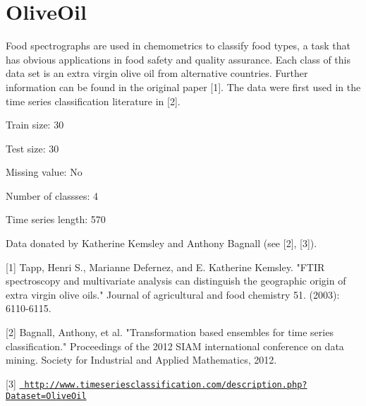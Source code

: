 \chapter{Olive\+Oil}
\hypertarget{md_external_2data_2UCRArchive__2018_2OliveOil_2README}{}\label{md_external_2data_2UCRArchive__2018_2OliveOil_2README}
\label{md_external_2data_2UCRArchive__2018_2OliveOil_2README_autotoc_md158}%
%
 Food spectrographs are used in chemometrics to classify food types, a task that has obvious applications in food safety and quality assurance. Each class of this data set is an extra virgin olive oil from alternative countries. Further information can be found in the original paper \mbox{[}1\mbox{]}. The data were first used in the time series classification literature in \mbox{[}2\mbox{]}.

Train size\+: 30

Test size\+: 30

Missing value\+: No

Number of classses\+: 4

Time series length\+: 570

Data donated by Katherine Kemsley and Anthony Bagnall (see \mbox{[}2\mbox{]}, \mbox{[}3\mbox{]}).

\mbox{[}1\mbox{]} Tapp, Henri S., Marianne Defernez, and E. Katherine Kemsley. "{}\+FTIR spectroscopy and multivariate analysis can distinguish the geographic origin of extra virgin olive oils."{} Journal of agricultural and food chemistry 51. (2003)\+: 6110-\/6115.

\mbox{[}2\mbox{]} Bagnall, Anthony, et al. "{}\+Transformation based ensembles for time series classification."{} Proceedings of the 2012 SIAM international conference on data mining. Society for Industrial and Applied Mathematics, 2012.

\mbox{[}3\mbox{]} \href{http://www.timeseriesclassification.com/description.php?Dataset=OliveOil}{\texttt{ http\+://www.\+timeseriesclassification.\+com/description.\+php?\+Dataset=\+Olive\+Oil}} 